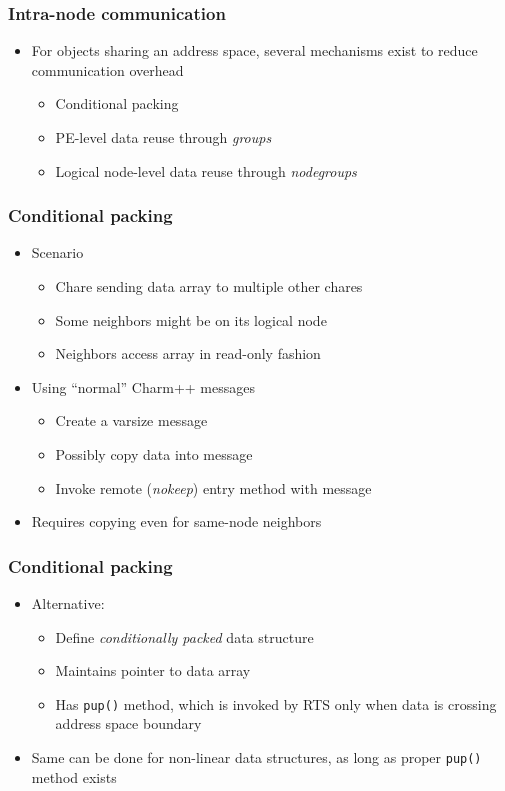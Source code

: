 \begin{frame}[fragile]
  \frametitle{Intra-node communication}
  \begin{itemize}
    \item For objects sharing an address space, several mechanisms exist to reduce communication overhead
    \begin{itemize}
      \item Conditional packing
      \item PE-level data reuse through {\em groups}
      \item Logical node-level data reuse through {\em nodegroups}
    \end{itemize}
  \end{itemize}
\end{frame}

\begin{frame}[fragile]
  \frametitle{Conditional packing}
  \begin{itemize}
  \item Scenario
    \begin{itemize}
      \item Chare sending data array to multiple other chares
      \item Some neighbors might be on its logical node
      \item Neighbors access array in read-only fashion
    \end{itemize}
  \item Using ``normal'' Charm++ messages
    \begin{itemize}
      \item Create a varsize message
      \item Possibly copy data into message
      \item Invoke remote ({\em nokeep}) entry method with message
    \end{itemize}
  \item Requires copying even for same-node neighbors
  \end{itemize}
\end{frame}

\begin{frame}[fragile]
  \frametitle{Conditional packing}
  \begin{itemize}
  \item Alternative:
    \begin{itemize}
    \item Define {\em conditionally packed} data structure
    \item Maintains pointer to data array
    \item Has {\tt pup()} method, which is invoked by RTS only when data is crossing address space boundary
    \end{itemize}
  \item Same can be done for non-linear data structures, as long as proper {\tt pup()} method exists
  \end{itemize}
\end{frame}

